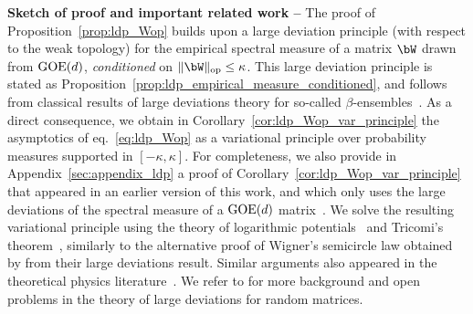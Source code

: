 \myskip 
\textbf{Sketch of proof and important related work --}
The proof of Proposition~\ref{prop:ldp_Wop} builds upon a large deviation principle (with respect to the weak topology) for the empirical spectral measure of a matrix $\bW$ drawn from $\mathrm{GOE}(d)$, \emph{conditioned} on $\|\bW\|_\op \leq \kappa$. 
This large deviation principle is stated as Proposition~\ref{prop:ldp_empirical_measure_conditioned}, and follows from classical results of large deviations theory for so-called $\beta$-ensembles~\citep{arous1997large,anderson2010introduction}. 
As a direct consequence, we obtain in Corollary~\ref{cor:ldp_Wop_var_principle} the asymptotics of eq.~\eqref{eq:ldp_Wop} as a variational principle over probability measures supported in $[-\kappa,\kappa]$.
For completeness, we also provide in Appendix~\ref{sec:appendix_ldp} a proof of Corollary~\ref{cor:ldp_Wop_var_principle} that appeared in an earlier version of this work, and which only uses the large deviations of the spectral measure of a $\mathrm{GOE}(d)$ matrix~\citep{arous1997large}.
We solve the resulting variational principle using the theory of logarithmic potentials~\citep{saff2013logarithmic} and Tricomi's theorem~\citep{tricomi1985integral}, similarly to the alternative proof of Wigner's semicircle law obtained by \cite{arous1997large} from their large deviations result.
Similar arguments also appeared in the theoretical physics literature~\citep{dean2006large,vivo2007large,dean2008extreme,majumdar2014top}. 
We refer to \cite{anderson2010introduction,guionnet2022rare} for more background and open problems in the theory of large deviations for random matrices.

